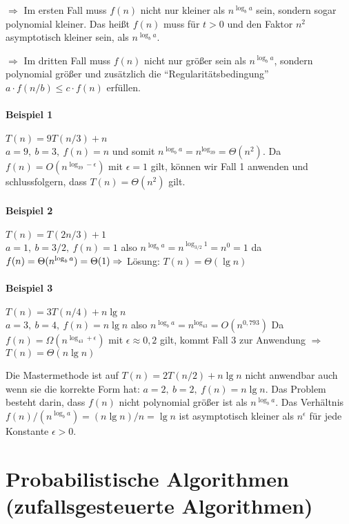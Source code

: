 \documentclass[a4paper,twoside,DIV15,BCOR12mm]{scrbook}
\begin{document}
$\Longrightarrow$ Im ersten Fall muss $f(n)$ nicht nur kleiner als $n^{\log_ba}$ sein, sondern sogar polynomial kleiner. Das heißt $f(n)$
      muss für $t>0$ und den Faktor $n^2$ asymptotisch kleiner sein, als $n^{\log_ba}$.
      
$\Longrightarrow$ Im dritten Fall muss $f(n)$ nicht nur größer sein als $n^{\log_ba}$, sondern polynomial größer und zusätzlich die
      "`Regularitätsbedingung"' $a \cdot f(n/b) \leq c \cdot f(n)$ erfüllen.
      
\paragraph{Beispiel 1} $T(n) = 9T(n/3)+n$\\
	$a=9,\ b=3,\ f(n)=n$ und somit $n^{\log_ba}=n^{\log_39}=\Theta(n^2)$. Da $f(n)=O(n^{\log_39-\epsilon})$ mit $\epsilon = 1$ gilt, können wir
	Fall 1 anwenden und schlussfolgern, dass $T(n)=\Theta(n^2)$ gilt.
	
\paragraph{Beispiel 2} $T(n) = T(2n/3)+1$\\
	$a=1,\ b=3/2,\ f(n)=1$ also $n^{\log_ba}=n^{\log_{3/2}1}=n^0=1$ da $f(n) = \Theta(n^{\log_ba}) = \Theta(1) \Rightarrow$ Lösung: $T(n)=\Theta(\lg n)$

\paragraph{Beispiel 3} $T(n) = 3T(n/4)+n \lg n$\\
	$a=3,\ b=4,\ f(n)=n \lg n$ also $n^{\log_ba}=n^{\log_43}=O(n^{0,793})$ Da $f(n)=\Omega(n^{\log_43+\epsilon})$ mit $\epsilon \approx 0,2$ 
	gilt, kommt Fall 3 zur Anwendung $\Rightarrow$ $T(n) = \Theta(n \lg n)$

\bigskip Die Mastermethode ist auf $T(n)=2T(n/2) + n \lg n$ nicht anwendbar auch wenn sie die korrekte Form hat: $a=2,\ b=2,\ f(n)=n \lg n$.
Das Problem besteht darin, dass $f(n)$ nicht polynomial größer ist als $n^{\log_b a}$.
Das Verhältnis $f(n)/(n^{\log_b a}) = (n \lg n)/n = \lg n$ ist asymptotisch kleiner als $n^\epsilon$ für jede Konstante $\epsilon > 0$.



\section{Probabilistische Algorithmen (zufallsgesteuerte Algorithmen)}
\end{document}
